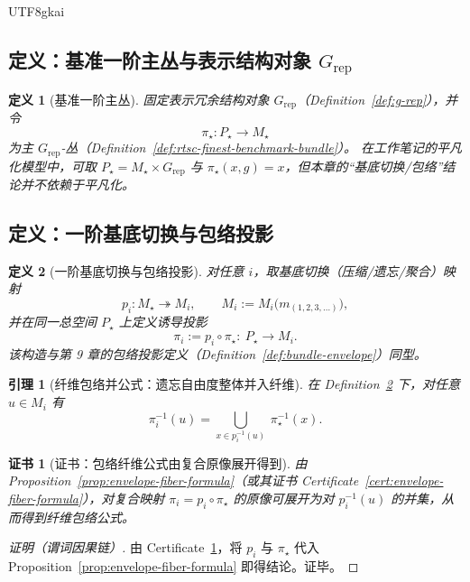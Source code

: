 \documentclass[12pt]{article}
\newtheorem{definition}{定义}[section]
\newtheorem{lemma}{引理}[section]
\newtheorem{certificate}{证书}[section]
\begin{document}
\begin{CJK*}{UTF8}{gkai}
\subsection{定义：基准一阶主丛与表示结构对象 $G_{\mathrm{rep}}$}

\begin{definition}[基准一阶主丛]
\label{def:first-order-benchmark-bundle}
固定表示冗余结构对象 $G_{\mathrm{rep}}$（Definition~\ref{def:g-rep}），并令
\[
\pi_\star:P_\star\to M_\star
\]
为主 $G_{\mathrm{rep}}$-丛（Definition~\ref{def:rtsc-finest-benchmark-bundle}）。
在工作笔记的平凡化模型中，可取 $P_\star=M_\star\times G_{\mathrm{rep}}$ 与 $\pi_\star(x,g)=x$，但本章的“基底切换/包络”结论并不依赖于平凡化。
\end{definition}

\subsection{定义：一阶基底切换与包络投影}

\begin{definition}[一阶基底切换与包络投影]
\label{def:first-order-base-switching}
对任意 $i$，取基底切换（压缩/遗忘/聚合）映射
\[
p_i: M_\star \twoheadrightarrow M_i,
\qquad
M_i:=M_i\bigl(m_{(1,2,3,\dots)}\bigr),
\]
并在同一总空间 $P_\star$ 上定义诱导投影
\[
\pi_i:=p_i\circ\pi_\star:\ P_\star\to M_i.
\]
该构造与第 9 章的包络投影定义（Definition~\ref{def:bundle-envelope}）同型。
\end{definition}

\begin{lemma}[纤维包络并公式：遗忘自由度整体并入纤维]
\label{lem:first-order-fiber-union}
在 Definition~\ref{def:first-order-base-switching} 下，对任意 $u\in M_i$ 有
\[
\pi_i^{-1}(u)=\bigcup_{x\in p_i^{-1}(u)}\ \pi_\star^{-1}(x).
\]
\end{lemma}

\begin{certificate}[证书：包络纤维公式由复合原像展开得到]
\label{cert:first-order-fiber-union}
由 Proposition~\ref{prop:envelope-fiber-formula}（或其证书 Certificate~\ref{cert:envelope-fiber-formula}），对复合映射
  $\pi_i=p_i\circ\pi_\star$ 的原像可展开为对 $p_i^{-1}(u)$ 的并集，从而得到纤维包络公式。
\end{certificate}

\begin{proof}[证明（谓词因果链）]
由 Certificate~\ref{cert:first-order-fiber-union}，将 $p_i$ 与 $\pi_\star$ 代入 Proposition~\ref{prop:envelope-fiber-formula}
  即得结论。证毕。
\end{proof}


\end{CJK*}
\end{document}

